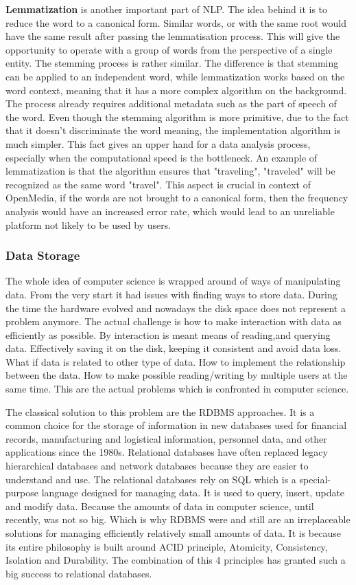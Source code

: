 \textbf{Lemmatization} is another important part of NLP. The idea behind it is to reduce the word to a canonical form. Similar words, or with the same root would have the same result after passing the lemmatisation process. This will give the opportunity to operate with a group of words from the perspective of a single entity. The stemming process is rather similar. The difference is that stemming can be applied to an independent word, while lemmatization works based on the word context, meaning that it has a more complex algorithm on the background. The process already requires additional metadata such as the part of speech of the word. Even though the stemming algorithm is more primitive, due to the fact that it doesn't discriminate the word meaning, the implementation algorithm is much simpler. This fact gives an upper hand for a data analysis process, especially when the computational speed is the bottleneck. An example of lemmatization is that the algorithm ensures that "traveling", "traveled" will be recognized as the same word "travel". This aspect is crucial in context of OpenMedia, if the words are not brought to a canonical form, then the frequency analysis would have an increased error rate, which would lead to an unreliable platform not likely to be used by users.

\subsubsection{Data Storage}
The whole idea of computer science is wrapped around of ways of manipulating data. From the very start it had issues with finding ways to store data. During the time the hardware evolved and nowadays the disk space does not represent a problem anymore. The actual challenge is how to make interaction with data as efficiently as possible. By interaction is meant means of reading,and querying data. Effectively saving it on the disk, keeping it consistent and avoid data loss. What if data is related to other type of data. How to  implement the relationship between the data. How to make possible reading/writing by multiple users at the same time. This are the actual problems which is confronted in computer science.

The classical solution to this problem are the RDBMS approaches. It is a common choice for the storage of information in new databases used for financial records, manufacturing and logistical information, personnel data, and other applications since the 1980s. Relational databases have often replaced legacy hierarchical databases and network databases because they are easier to understand and use. The relational databases rely on SQL which is a special-purpose language designed for managing data. It is used to query, insert, update and modify data. Because the amounts of data in computer science, until recently, was not so big. Which is why RDBMS were and still are an irreplaceable solutions for managing efficiently relatively small amounts of data. It is because its entire philosophy is built around ACID principle, Atomicity, Consistency, Isolation and Durability. The combination of this 4 principles has granted such a big success to relational databases.


